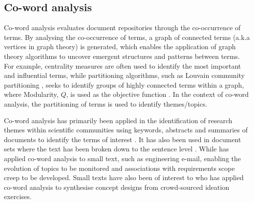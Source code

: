 \documentclass[a4paper, 11pt]{article}
\begin{document}
\subsection{Co-word analysis}

Co-word analysis evaluates document repositories through the co-occurrence of terms. By analysing the co-occurrence of terms, a graph of connected terms (a.k.a vertices in graph theory) is generated, which enables the application of graph theory algorithms to uncover emergent structures and patterns between terms. For example, centrality measures are often used to identify the most important and influential terms, while partitioning algorithms, such as Louvain community partitioning \parencite{blondel2008,hagberg2008}, seeks to identify groups of highly connected terms within a graph, where Modularity, $Q$, is used as the objective function \parencite{newman2004,newman2006}. In the context of co-word analysis, the partitioning of terms is used to identify themes/topics.

Co-word analysis has primarily been applied in the identification of research themes within scientific communities using keywords, abstracts and summaries of documents to identify the terms of interest \parencite{ding2001,liu2014}.
It has also been used in document sets where the text has been broken down to the sentence level \parencite{le2014distributed}.
While \textcite{gopsill2015} has applied co-word analysis to small text, such as engineering e-mail, enabling the evolution of topics to be monitored and associations with requirements scope creep to be developed.
Small texts have also been of interest to \textcite{he2019} who has applied co-word analysis to synthesise concept designs from crowd-sourced ideation exercises.
\end{document}
